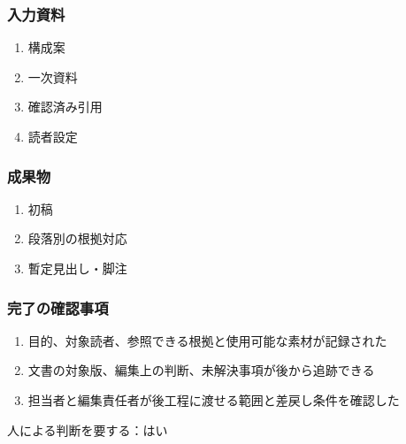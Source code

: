 \documentclass[a4paper,11pt]{article}
\begin{document}
\subsubsection*{入力資料}
\begin{enumerate}[leftmargin=2em,itemsep=0.35em]
\item 構成案
\item 一次資料
\item 確認済み引用
\item 読者設定
\end{enumerate}
\subsubsection*{成果物}
\begin{enumerate}[leftmargin=2em,itemsep=0.35em]
\item 初稿
\item 段落別の根拠対応
\item 暫定見出し・脚注
\end{enumerate}
\subsubsection*{完了の確認事項}
\begin{enumerate}[leftmargin=2em,itemsep=0.35em]
\item 目的、対象読者、参照できる根拠と使用可能な素材が記録された
\item 文書の対象版、編集上の判断、未解決事項が後から追跡できる
\item 担当者と編集責任者が後工程に渡せる範囲と差戻し条件を確認した
\end{enumerate}
\par 人による判断を要する：はい\par\medskip
\end{document}
